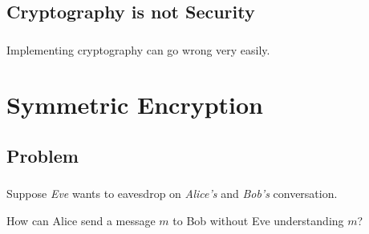 \documentclass{beamer}
\begin{document}
      \subsection{Cryptography is not Security}
        \begin{frame}
          \frametitle{\insertsubsection}
          \begin{center}
            Implementing cryptography can go wrong very easily.
          \end{center}
        \end{frame}
  \section{Symmetric Encryption}
    \subsection{Problem}
      \begin{frame}
        \frametitle{\insertsubsection}
        Suppose \textit{Eve} wants to eavesdrop on \textit{Alice's} and \textit{Bob's}
        conversation.

        How can Alice send a message $m$ to Bob without Eve understanding $m$?

        \begin{center}
          
        \end{center}
      \end{frame}
\end{document}
